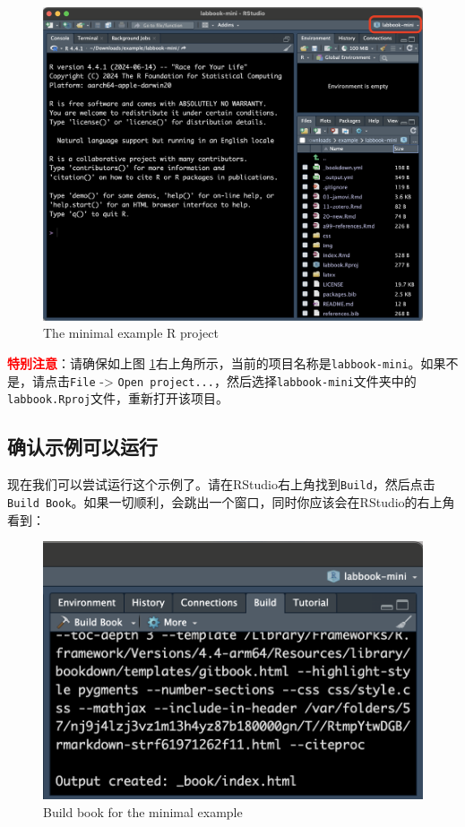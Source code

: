 \documentclass[]{ctexbook}
\theoremstyle{definition}
\theoremstyle{definition}
\theoremstyle{definition}
\theoremstyle{definition}
\theoremstyle{remark}
\begin{document}
\begin{figure}

{\centering \includegraphics[width=0.9\linewidth]{img/contribute/mini_rproj} 

}

\caption{The minimal example R project}\label{fig:contri-mini-rproj}
\end{figure}

\textcolor{red}{\textbf{特别注意}}：请确保如上图 \ref{fig:contri-mini-rproj}右上角所示，当前的项目名称是\texttt{labbook-mini}。如果不是，请点击\texttt{File} -\textgreater{} \texttt{Open\ project...}，然后选择\texttt{labbook-mini}文件夹中的\texttt{labbook.Rproj}文件，重新打开该项目。

\subsection{确认示例可以运行}\label{ux786eux8ba4ux793aux4f8bux53efux4ee5ux8fd0ux884c}

现在我们可以尝试运行这个示例了。请在RStudio右上角找到\texttt{Build}，然后点击\texttt{Build\ Book}。如果一切顺利，会跳出一个窗口，同时你应该会在RStudio的右上角看到：

\begin{figure}

{\centering \includegraphics[width=0.7\linewidth]{img/contribute/mini_build} 

}

\caption{Build book for the minimal example}\label{fig:contri-mini-build}
\end{figure}
\end{document}
